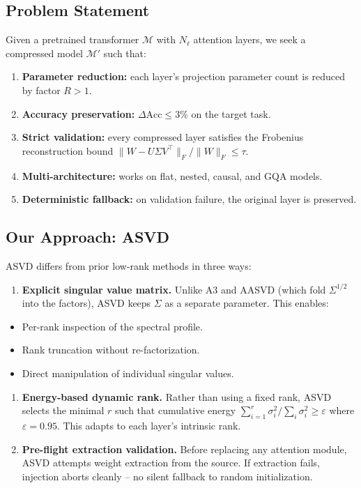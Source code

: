 \subsection{Problem Statement}

Given a pretrained transformer $\mathcal{M}$ with $N_\ell$ attention layers, 
we seek a compressed model $\mathcal{M}'$ such that:

\begin{enumerate}
\item \textbf{Parameter reduction:} each layer's projection parameter count is
  reduced by factor $R > 1$.
\item \textbf{Accuracy preservation:} $\Delta\text{Acc} \leq 3\%$ on
  the target task.
\item \textbf{Strict validation:} every compressed layer satisfies the Frobenius
  reconstruction bound $\|W - U \Sigma V^\top\|_F / \|W\|_F \leq \tau$.
\item \textbf{Multi-architecture:} works on flat, nested, causal, and GQA models.
\item \textbf{Deterministic fallback:} on validation failure, the original layer is
  preserved.

\end{enumerate}
\subsection{Our Approach: ASVD}

ASVD differs from prior low-rank methods in three ways:

\begin{enumerate}
\item \textbf{Explicit singular value matrix.} Unlike A3 and AASVD (which fold
  $\Sigma^{1/2}$ into the factors), ASVD keeps $\Sigma$ as a separate
  parameter. This enables:
\end{enumerate}
\begin{itemize}
\item Per-rank inspection of the spectral profile.
\item Rank truncation without re-factorization.
\item Direct manipulation of individual singular values.

\end{itemize}
\begin{enumerate}
\item \textbf{Energy-based dynamic rank.} Rather than using a fixed rank, ASVD
  selects the minimal $r$ such that cumulative energy
  $\sum_{i=1}^r \sigma_i^2 / \sum_i \sigma_i^2 \geq \varepsilon$ where
  $\varepsilon = 0.95$. This adapts to each layer's
  intrinsic rank.

\item \textbf{Pre-flight extraction validation.} Before replacing any attention
  module, ASVD attempts weight extraction from the source. If extraction
  fails, injection aborts cleanly -- no silent fallback to random
  initialization.

\end{enumerate}
